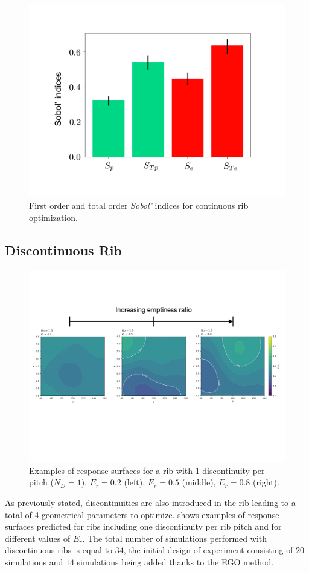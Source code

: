 \begin{figure}[ht]
\centering
\includegraphics[width=0.6\linewidth,keepaspectratio]{fig/applications/optim/Sobol_continu.pdf}
\caption{First order and total order \emph{Sobol'} indices for continuous rib optimization.}
\label{sensitivity2D}
\end{figure}

\subsection{Discontinuous Rib}
\label{sec:discontinuous_rib}

\begin{figure}[h!]
\centering
\includegraphics[width=\linewidth,keepaspectratio]{fig/applications/optim/GP_1ND.pdf}
\caption{Examples of response surfaces for a rib with 1 discontinuity per pitch ($N_D=1$). $E_r=0.2$ (left), $E_r=0.5$ (middle), $E_r=0.8$ (right).}
\label{1D_RS}
\end{figure}

As previously stated, discontinuities are also introduced in the rib leading to a total of 4 geometrical parameters to optimize.  shows examples of response surfaces predicted for ribs including one discontinuity per rib pitch and for different values of $E_r$. The total number of simulations performed with discontinuous ribs is equal to $34$, the initial design of experiment consisting of $20$ simulations and $14$ simulations being added thanks to the EGO method.\\

